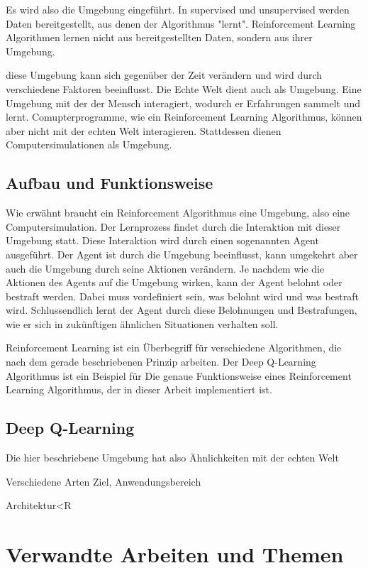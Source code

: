 Es wird also die Umgebung eingeführt. In supervised und
unsupervised werden Daten bereitgestellt, aus denen der Algorithmus "lernt".
Reinforcement Learning Algorithmen lernen nicht aus bereitgestellten Daten, sondern aus ihrer Umgebung.

diese Umgebung kann sich gegenüber der Zeit verändern und wird durch
verschiedene Faktoren beeinflusst. Die Echte Welt dient auch als Umgebung. Eine
Umgebung mit der der Mensch interagiert, wodurch er Erfahrungen sammelt und
lernt. Comupterprogramme, wie ein Reinforcement Learning Algorithmus, können
aber nicht mit der echten Welt interagieren. Stattdessen dienen Computersimulationen als Umgebung.

\subsection*{Aufbau und Funktionsweise}

Wie erwähnt braucht ein Reinforcement Algorithmus eine Umgebung, also eine
Computersimulation. Der Lernprozess findet durch die Interaktion mit dieser
Umgebung statt. Diese Interaktion wird durch einen sogenannten Agent ausgeführt.
Der Agent ist durch die Umgebung beeinflusst, kann umgekehrt aber auch die
Umgebung durch seine Aktionen verändern. Je nachdem wie die Aktionen des Agents
auf die Umgebung wirken, kann der Agent belohnt oder bestraft werden. Dabei muss
vordefiniert sein, was belohnt wird und was bestraft wird. Schlussendlich lernt
der Agent durch diese Belohnungen und Bestrafungen, wie er sich in zukünftigen
ähnlichen Situationen verhalten soll. 

Reinforcement Learning ist ein Überbegriff für verschiedene Algorithmen, die
nach dem gerade beschriebenen Prinzip arbeiten. Der Deep Q-Learning Algorithmus
ist ein Beispiel für Die genaue Funktionsweise eines Reinforcement Learning
Algorithmus, der in dieser Arbeit implementiert ist.

\subsection*{Deep Q-Learning}



Die hier beschriebene Umgebung hat also
Ähnlichkeiten mit der echten Welt




Verschiedene Arten
Ziel, Anwendungsbereich

Architektur<R


\section{Verwandte Arbeiten und Themen}
\label{chap:t_verwandt}

